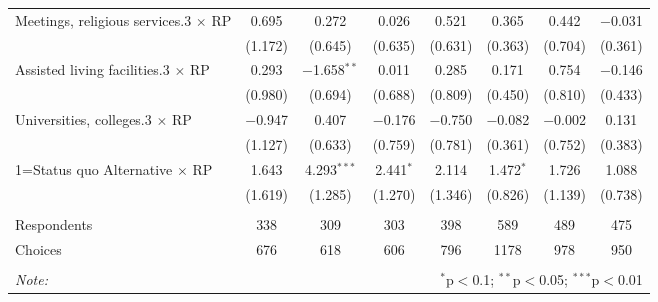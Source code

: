 \begin{table}[!htbp]
\begin{tabular}{@{\extracolsep{5pt}}lccccccc}
  Meetings, religious services.3 $\times$ RP & 0.695 & 0.272 & 0.026 & 0.521 & 0.365 & 0.442 & $-$0.031 \\ 
  & (1.172) & (0.645) & (0.635) & (0.631) & (0.363) & (0.704) & (0.361) \\ 
  Assisted living facilities.3 $\times$ RP & 0.293 & $-$1.658$^{**}$ & 0.011 & 0.285 & 0.171 & 0.754 & $-$0.146 \\ 
  & (0.980) & (0.694) & (0.688) & (0.809) & (0.450) & (0.810) & (0.433) \\ 
  Universities, colleges.3 $\times$ RP & $-$0.947 & 0.407 & $-$0.176 & $-$0.750 & $-$0.082 & $-$0.002 & 0.131 \\ 
  & (1.127) & (0.633) & (0.759) & (0.781) & (0.361) & (0.752) & (0.383) \\ 
  1=Status quo Alternative $\times$ RP & 1.643 & 4.293$^{***}$ & 2.441$^{*}$ & 2.114 & 1.472$^{*}$ & 1.726 & 1.088 \\ 
  & (1.619) & (1.285) & (1.270) & (1.346) & (0.826) & (1.139) & (0.738) \\ 
 \hline \\[-1.8ex] 
Respondents & 338 & 309 & 303 & 398 & 589 & 489 & 475\\ 
 Choices & 676 & 618 & 606 & 796 & 1178 & 978 & 950\\ 
\hline 
\hline \\[-1.8ex] 
\textit{Note:}  & \multicolumn{7}{r}{$^{*}$p$<$0.1; $^{**}$p$<$0.05; $^{***}$p$<$0.01} \\ 
\end{tabular} 
\end{table} 
